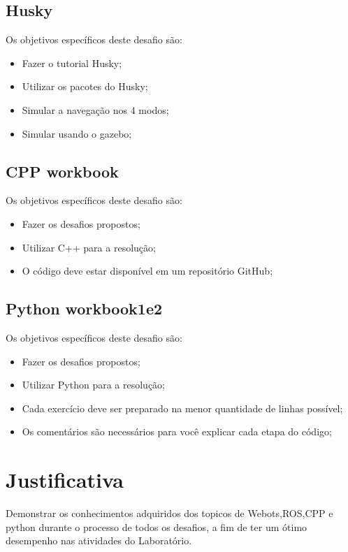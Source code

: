 \subsection{Husky}
Os objetivos específicos deste desafio são:
\begin{itemize}
      \item Fazer o tutorial Husky;
      \item Utilizar os pacotes do Husky;
      \item Simular a navegação nos 4 modos;
      \item Simular usando o gazebo;
  \end{itemize}
\subsection{CPP workbook}
Os objetivos específicos deste desafio são:
\begin{itemize}
      \item Fazer os desafios propostos;
      \item Utilizar C++ para a resolução;
      \item O código deve estar disponível em um repositório GitHub;
  \end{itemize}
  \subsection{Python workbook1e2}
  Os objetivos específicos deste desafio são:
  \begin{itemize}
        \item Fazer os desafios propostos;
        \item Utilizar Python para a resolução;
        \item Cada exercício deve ser preparado na menor quantidade de linhas possível;
        \item Os comentários são necessários para você explicar cada etapa do código;
    \end{itemize}
\section{Justificativa}
\label{sec:justi}

Demonstrar os conhecimentos adquiridos dos topicos de Webots,ROS,CPP e python durante o processo de todos os desafios, 
a fim de ter um ótimo desempenho nas atividades do Laboratório.

